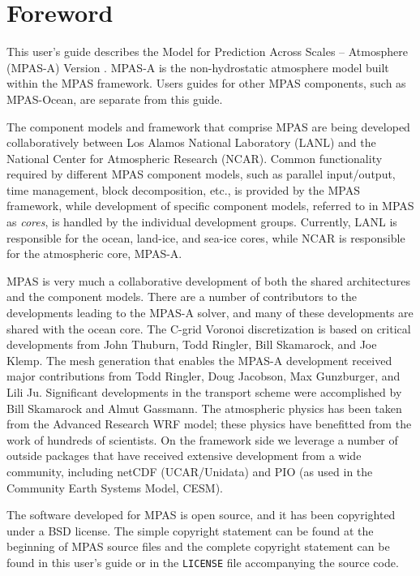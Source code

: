 \chapter*{Foreword}
\label{chap:foreword}

This user's guide describes the Model for Prediction Across Scales -- Atmosphere
(MPAS-A) Version \version.   MPAS-A is the non-hydrostatic atmosphere model built within the MPAS
framework. Users guides for other MPAS components, such as MPAS-Ocean, are separate from this guide.

The component models and framework that comprise MPAS are being developed collaboratively between Los Alamos National
Laboratory (LANL) and the National Center for Atmospheric Research (NCAR).
Common functionality required by different MPAS component models, such as parallel
input/output, time management, block decomposition, etc., is provided by the
MPAS framework, while development of specific component models, referred to in MPAS as {\em cores}, is handled by the
individual development groups.  Currently, LANL is responsible for the ocean, land-ice, and sea-ice cores, while NCAR
is responsible for the atmospheric core, MPAS-A.

MPAS is very much a collaborative development of both the shared architectures and the component models.  There are a number of contributors to the developments leading to the MPAS-A solver, and many of these developments are shared with the ocean core.  The C-grid Voronoi discretization is based on critical developments from John Thuburn, Todd Ringler, Bill Skamarock, and Joe Klemp.  The mesh generation that enables the MPAS-A development received major contributions from Todd Ringler, Doug Jacobson, Max Gunzburger, and Lili Ju.  Significant developments in the transport scheme were accomplished by Bill Skamarock and Almut Gassmann.  The atmospheric physics has been taken from the Advanced Research WRF model; these physics have benefitted from the work of hundreds of scientists.  On the framework side we leverage a number of outside packages that have received extensive development from a wide community, including netCDF (UCAR/Unidata) and PIO (as used in the Community Earth Systems Model, CESM).

The software developed for MPAS is open source, and it has been copyrighted under a BSD license.  The simple copyright statement can
be found at the beginning of MPAS source files and the complete copyright statement can be found in this user's guide or in the {\tt LICENSE} file accompanying the source code.

